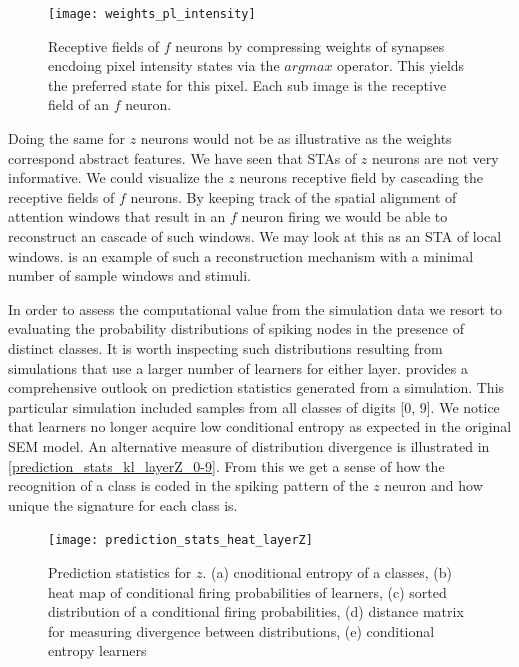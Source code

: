 \documentclass{report}
\begin{document}
\begin{figure}[ht]
\centering
\texttt{[image: weights\_pl\_intensity]}
\caption{Receptive fields of $f$ neurons by compressing weights of synapses encdoing pixel intensity states via the $argmax$ operator. This yields the preferred state for this pixel. Each sub image is the receptive field of an $f$ neuron.
\label{fig:weights_pl_intensity}}
\end{figure}

Doing the same for $z$ neurons would not be as illustrative as the weights correspond abstract features. We have seen that STAs of $z$ neurons are not very informative. We could visualize the $z$ neurons receptive field by cascading the receptive fields of $f$ neurons. By keeping track of the spatial alignment of attention windows that result in an $f$ neuron firing we would be able to reconstruct an cascade of such windows. We may look at this as an STA of local windows.  is an example of such a reconstruction mechanism with a minimal number of sample windows and stimuli. 

In order to assess the computational value from the simulation data we resort to evaluating the probability distributions of spiking nodes in the presence of distinct classes. It is worth inspecting such distributions resulting from simulations that use a larger number of learners for either layer.  provides a comprehensive outlook on prediction statistics generated from a simulation. This particular simulation included samples from all classes of digits [0, 9]. We notice that learners no longer acquire low conditional entropy as expected in the original SEM model. An alternative measure of distribution divergence is illustrated in \cref{prediction_stats_kl_layerZ_0-9}. From this we get a sense of how the recognition of a class is coded in the spiking pattern of the $z$ neuron and how unique the signature for each class is.\\

\begin{figure}[ht]
\centering
\texttt{[image: prediction\_stats\_heat\_layerZ]}
\caption{Prediction statistics for $z$. (a) cnoditional entropy of a classes, (b) heat map of conditional firing probabilities of learners, (c) sorted distribution of a conditional firing probabilities, (d) distance matrix for measuring divergence between distributions, (e) conditional entropy learners 
\label{fig:prediction_stats_heat_layerZ}}
\end{figure}
\end{document}
